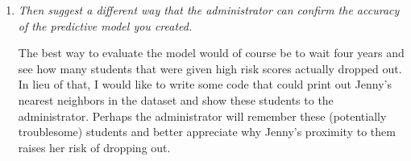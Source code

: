 \documentclass[11pt]{article}
\begin{document}
\begin{enumerate}
\begin{enumerate}
            \item \textit{Then suggest a different way that the administrator
                can confirm the accuracy of the predictive model you created.}

                The best way to evaluate the model would of course be to wait
                four years and see how many students that were given high risk
                scores actually dropped out. In lieu of that, I would like to
                write some code that could print out Jenny's nearest neighbors
                in the dataset and show these students to the administrator.
                Perhaps the administrator will remember these (potentially
                troublesome) students and better appreciate why Jenny's
                proximity to them raises her risk of dropping out.
        \end{enumerate}
\end{enumerate}
\end{document}
